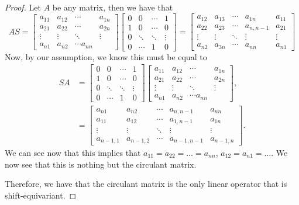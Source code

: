 \documentclass[twoside]{article}
\begin{document}
\begin{proof}
	Let $A$ be any matrix, then we have that
	\begin{equation*}
		AS =
		\begin{bmatrix}
			a_{11} & a_{12} & \cdots        & a_{1n} \\
			a_{21} & a_{22} & \cdots        & a_{2n} \\
			\vdots & \vdots & \ddots        & \vdots \\
			a_{n1} & a_{n2} & \cdots a_{nn}
		\end{bmatrix}
		\begin{bmatrix}
			0 & 0      & \cdots & 1      \\
			1 & 0      & \cdots & 0      \\
			0 & \ddots & \ddots & \vdots \\
			0 & \cdots & 1      & 0
		\end{bmatrix}
		=
		\begin{bmatrix}
			a_{12} & a_{13} & \cdots & a_{1n}       & a_{11} \\
			a_{22} & a_{23} & \cdots & a_{n, n - 1} & a_{21} \\
			\vdots & \vdots & \ddots & \vdots       & \vdots \\
			a_{n2} & a_{3n} & \cdots & a_{nn}       & a_{n1}
		\end{bmatrix}
	\end{equation*}
	Now, by our assumption, we know this must be equal to
	\begin{align*}
		SA
		 & =
		\begin{bmatrix}
			0 & 0      & \cdots & 1      \\
			1 & 0      & \cdots & 0      \\
			0 & \ddots & \ddots & \vdots \\
			0 & \cdots & 1      & 0
		\end{bmatrix}
		\begin{bmatrix}
			a_{11} & a_{12} & \cdots        & a_{1n} \\
			a_{21} & a_{22} & \cdots        & a_{2n} \\
			\vdots & \vdots & \ddots        & \vdots \\
			a_{n1} & a_{n2} & \cdots a_{nn}
		\end{bmatrix}, \\
		 & =
		\begin{bmatrix}
			a_{n1}       & a_{n2}       & \cdots & a_{n, n-1}     & a_{nn}       \\
			a_{11}       & a_{12}       & \cdots & a_{1, n - 1}   & a_{1n}       \\
			\vdots       & \vdots       & \ddots & \vdots         & \vdots       \\
			a_{n - 1, 1} & a_{n - 1, 2} & \cdots & a_{n - 1, n-1} & a_{n - 1, n}
		\end{bmatrix}.
	\end{align*}
	We can see now that this implies that $a_{11} = a_{22} = \dots = a_{nn}$,
	$a_{12} = a_{n1} = \dots$. We now see that this is nothing
	but the circulant matrix.

	Therefore, we have that the circulant matrix is the only linear operator that
	is shift-equivariant.
\end{proof}
\end{document}
